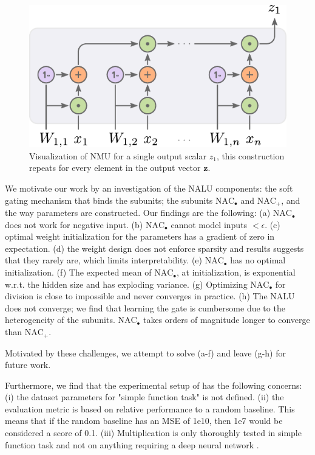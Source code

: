 \begin{figure}[h]
\centering
\includegraphics[scale=0.6]{graphics/nmu.pdf}
\caption{Visualization of NMU for a single output scalar $z_1$, this construction repeats for every element in the output vector $\mathbf{z}$.}
\end{figure}
We motivate our work by an investigation of the NALU components: the soft gating mechanism that binds the subunits; the subunits $\text{NAC}_{\bullet}$ and $\text{NAC}_{+}$, and the way parameters are constructed.
Our findings are the following:
(a) $\text{NAC}_{\bullet}$ does not work for negative input.
(b) $\text{NAC}_{\bullet}$ cannot model inputs $<\epsilon$.
(c) optimal weight initialization for the parameters has a gradient of zero in expectation.
(d) the weight design does not enforce sparsity and results suggests that they rarely are, which limits interpretability.
(e) $\text{NAC}_{\bullet}$ has no optimal initialization.
(f) The expected mean of $\text{NAC}_{\bullet}$, at initialization, is exponential w.r.t. the hidden size and has exploding variance.
(g) Optimizing $\text{NAC}_{\bullet}$ for division is close to impossible and never converges in practice.
(h) The NALU does not converge; we find that learning the gate is cumbersome due to the heterogeneity of the subunits. $\text{NAC}_{\bullet}$ takes orders of magnitude longer to converge than $\text{NAC}_{+}$.%

Motivated by these challenges, we attempt to solve (a-f) and leave (g-h) for future work.

Furthermore, we find that the experimental setup of \citet{trask-nalu} has the following concerns: (i) the dataset parameters for "simple function task" is not defined. (ii) the evaluation metric is based on relative performance to a random baseline. This means that if the random baseline has an MSE of 1e10, then 1e7 would be considered a score of 0.1. (iii) Multiplication is only thoroughly tested in simple function task and not on anything requiring a deep neural network .

